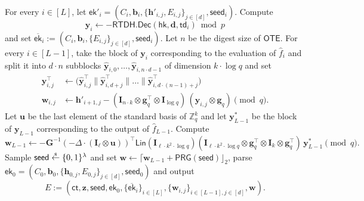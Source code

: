\documentclass{theoretics}
\newcommand{\ek}{\mathsf{ek}}
\newcommand{\td}{\mathsf{td}}
\newcommand{\getsr}{\overset{\raisebox{-1pt}{$\scriptscriptstyle \$$}}{\gets}}
\newcommand{\sample}{\getsr}
\newcommand{\OTE}{\mathsf{OTE}}
\newcommand{\Z}{\mathbb{Z}}
\renewcommand{\sec}{\ensuremath{\lambda}}
\newcommand{\ct}{\mathsf{ct}}
\newcommand{\RTDH}{\mathsf{RTDH}}
\newcommand{\algofont}[1]{\ensuremath{\mathsf{#1}}}
\newcommand{\Dec}{{\algofont{Dec}}}
\newcommand{\id}{\ensuremath{\mathbf{I}}}
\newcommand{\hk}{\ensuremath{\mathsf{hk}}}
\newenvironment{protocol}[1][]
{\begin{algorithm}\caption{#1}}
  {\end{algorithm}}
\begin{document}
\addtocounter{algocf}{-1}
\begin{protocol}[(cont.)]
  \begin{description}
  \item
    For every $i\in[L]$, let $\ek'_i=(C_i, \mathbf{b}_i, \{\mathbf{h}'_{i, j}, E_{i, j}\}_{j\in[d]}, \mathsf{seed}_i)$. Compute 
\[\mathbf{y}_i\gets -\RTDH.\Dec(\hk, \mathbf{d}, \td_i)\bmod p\]
and set $\overline{\ek}_i:= (C_i, \mathbf{b}_i, \{E_{i, j}\}_{j\in[d]}, \mathsf{seed}_i)$.
 Let $n$ be the digest size of $\OTE$. For every $i\in[L-1]$, take the block of $\mathbf{y}_{i}$ corresponding to the evaluation of $\hat{f}_i$ and split it into $d\cdot n$ subblocks $\hat{\mathbf{y}}_{i, 0}, \dots, \hat{\mathbf{y}}_{i, n\cdot d-1}$ of dimension $k\cdot \log q$ and set
\begin{align*}
\mathbf{y}_{i, j}^\intercal&\gets \bigl(\hat{\mathbf{y}}_{i, j}^\intercal \mathbin{\|} \hat{\mathbf{y}}_{i, d+j}^\intercal \mathbin{\|}\dots \mathbin{\|} \hat{\mathbf{y}}_{i, d\cdot (n-1)+j}^\intercal\bigr)\\
  \mathbf{w}_{i, j}&\gets \mathbf{h}'_{i+1, j}- (\id_{n\cdot k}\otimes \mathbf{g}_q^\intercal\otimes \id_{\log q})\,(\mathbf{y}_{i,j}\otimes \mathbf{g}_q)\pmod q.
\end{align*}                     
Let $\mathbf{u}$ be the last element of the standard basis of $\Z_q^k$ and let $\mathbf{y}^\ast_{L-1}$ be the block of ${\mathbf{y}}_{L-1}$ corresponding to the output of $\hat{f}_{L-1}$. Compute \[ \mathbf{w}_{L-1}\gets -\mathbf{G}^{-1}(-\Delta\cdot (\id_\ell\otimes \mathbf u))^\intercal \mathsf{Lin}(\id_{\ell\cdot k^2\cdot \log q}) (\id_{\ell\cdot k^2\cdot \log q}\otimes \mathbf g_q^\intercal\otimes \id_k\otimes \mathbf g_q^\intercal) \,\mathbf{y}^\ast_{L-1}\pmod q. \]
Sample $\mathsf{seed}\sample\{0, 1\}^\sec$ and set $\mathbf{w}\gets \lceil\mathbf{w}_{L-1}+\mathsf{PRG}(\mathsf{seed})\rfloor_2$, parse $\mathsf{ek}_0=(C_0,\mathbf b_0,\{\mathbf h_{0,j},E_{0,j}\}_{j\in[d]},\mathsf{seed}_0)$ and output \[E:=(\ct, \mathbf{z}, \mathsf{seed}, \ek_0, \{\overline{\ek}_i\}_{i\in[L]}, \{\mathbf{w}_{i, j}\}_{i\in[L-1], j\in[d]}, \mathbf{w}).\]
%


\end{description}
\end{protocol}
\end{document}
